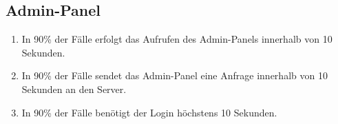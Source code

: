 \subsection*{Admin-Panel}

\begin{samepage}
    \begin{enumerate}[label=\textbf{/NFL\arabic*0/}, align=left, start=10]
        \item In 90\% der Fälle erfolgt das Aufrufen des \Gls{Admin-Panel}s innerhalb von 10 Sekunden.
        \item In 90\% der Fälle sendet das \Gls{Admin-Panel} eine Anfrage innerhalb von 10 Sekunden an den \Gls{Server}.
        \item In 90\% der Fälle benötigt der \Gls{Login} höchstens 10 Sekunden.
    \end{enumerate}
\end{samepage}